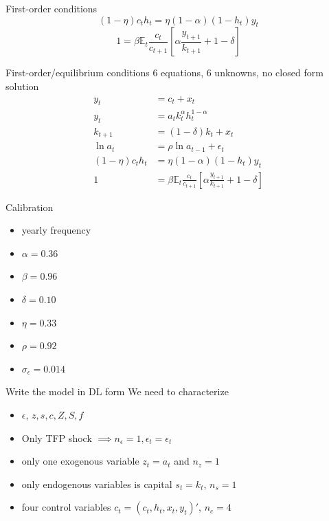 \documentclass[aspectratio=169]{beamer} %
\begin{document}
\begin{frame}{First-order conditions}
$$
(1-\eta)c_th_t = \eta(1-\alpha) (1-h_t)y_t
$$
$$
1= \beta\mathbb{E}_t\frac{c_t}{c_{t+1}} \left[\alpha \frac{y_{t+1}}{k_{t+1}}+1-\delta\right]
$$
    
\end{frame}

\begin{frame}{First-order/equilibrium conditions}
    6 equations, 6 unknowns, no closed form solution
\begin{align*}
    y_t &= c_t + x_t\\
    y_t &= a_tk_t^\alpha h_t^{1-\alpha}\\
    k_{t+1} &=(1-\delta) k_t + x_t\\
    \ln a_t &= \rho \ln a_{t-1} + \epsilon_t\\
    (1-\eta)c_th_t &= \eta(1-\alpha) (1-h_t)y_t\\
    1&= \beta\mathbb{E}_t\frac{c_t}{c_{t+1}} \left[\alpha \frac{y_{t+1}}{k_{t+1}}+1-\delta\right]
\end{align*}
\end{frame}

\begin{frame}{Calibration}
\begin{itemize}
    \item yearly frequency
    \item $\alpha = 0.36$
    \item $\beta=0.96$
    \item $\delta=0.10$
    \item $\eta=0.33$
    \item $\rho=0.92$
    \item $\sigma_{\epsilon} = 0.014$
\end{itemize}
    
\end{frame}

\begin{frame}{Write the model in DL form}
We need to characterize
\begin{itemize}
    \item $\epsilon$, $z, s,c,Z,S,f$
    \item Only TFP shock $\implies n_\epsilon =1,\epsilon_t = \epsilon_t$
    \item only one exogenous variable $z_t = a_t$ and $n_z=1$
    \item only endogenous variables is capital $s_t=k_t$, $n_s=1$
    \item four control variables $c_t = (c_t, h_t,x_t, y_t)'$, $n_c=4$
\end{itemize}
    
\end{frame}
\end{document}
